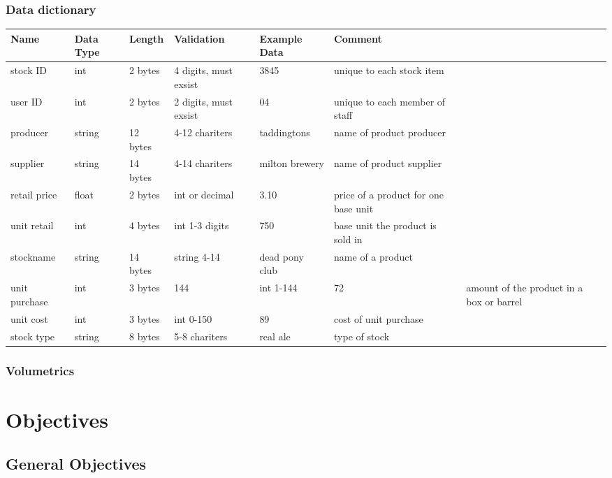 \subsubsection{Data dictionary}
\begin{center}
\begin{tabular}{|l|l|l|l|l|l|}
    \hline
    \textbf{Name} & \textbf{Data Type} & \textbf{Length} & \textbf{Validation} & \textbf{Example Data} & \textbf{Comment} \\ \hline
	stock ID & int & 2 bytes & 4 digits, must exsist & 3845 & unique to each stock item\\ \hline
	user ID & int & 2 bytes & 2 digits, must exsist & 04 & unique to each member of staff\\ \hline
	producer & string & 12 bytes & 4-12 chariters & taddingtons & name of product producer\\ \hline
	supplier & string & 14 bytes & 4-14 chariters & milton brewery & name of product supplier \\ \hline
	retail price & float & 2 bytes & int or decimal & 3.10 & price of a product for one base unit\\ \hline
	unit retail & int & 4 bytes & int 1-3 digits & 750 & base unit the product is sold in\\ \hline
	stockname & string & 14 bytes & string 4-14 & dead pony club & name of a product\\ \hline
	unit purchase & int & 3 bytes & 144 & int 1-144 & 72 & amount of the product in a box or barrel\\ \hline
	unit cost & int & 3 bytes & int 0-150 & 89 & cost of unit purchase\\ \hline
	stock type & string & 8 bytes & 5-8 chariters & real ale & type of stock\\ \hline
	 
\end{tabular}
\label{tab:range_examples}
\end{center}
\subsubsection{Volumetrics}

\section{Objectives}

\subsection{General Objectives}

